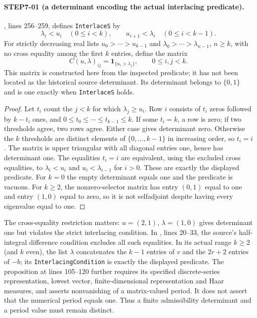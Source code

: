 \paragraph{STEP7-01 (a determinant encoding the actual interlacing predicate).}
, lines 256--259, defines \texttt{InterlaceS} by
\[
 \lambda_i<u_i\quad(0\le i<k),\qquad
 u_{i+1}<\lambda_i\quad(0\le i<k-1).
\]
For strictly decreasing real lists $u_0>\cdots>u_{k-1}$ and $\lambda_0>\cdots>\lambda_{n-1}$, $n\ge k$, with no cross equality among the first $k$ entries, define the matrix
\[
 C(u,\lambda)_{ij}=\mathbf1_{\{u_i>\lambda_j\}},\qquad 0\le i,j<k.
\]
This matrix is constructed here from the inspected predicate; it has not been located as the historical source determinant. Its determinant belongs to $\{0,1\}$ and is one exactly when \texttt{InterlaceS} holds.
\begin{proof}
Let $t_i$ count the $j<k$ for which $\lambda_j\ge u_i$. Row $i$ consists of $t_i$ zeros followed by $k-t_i$ ones, and $0\le t_0\le\cdots\le t_{k-1}\le k$. If some $t_i=k$, a row is zero; if two thresholds agree, two rows agree. Either case gives determinant zero. Otherwise the $k$ thresholds are distinct elements of $\{0,\ldots,k-1\}$ in increasing order, so $t_i=i$. The matrix is upper triangular with all diagonal entries one, hence has determinant one. The equalities $t_i=i$ are equivalent, using the excluded cross equalities, to $\lambda_i<u_i$ and $u_i<\lambda_{i-1}$ for $i>0$. These are exactly the displayed predicate. For $k=0$ the empty determinant equals one and the predicate is vacuous. For $k\ge2$, the nonzero-selector matrix has entry $(0,1)$ equal to one and entry $(1,0)$ equal to zero, so it is not selfadjoint despite having every eigenvalue equal to one.
\end{proof}
The cross-equality restriction matters: $u=(2,1)$, $\lambda=(1,0)$ gives determinant one but violates the strict interlacing condition. In , lines 20--33, the source's half-integral difference condition excludes all such equalities. In its actual range $k\ge2$ (and $k$ even), the list $\lambda$ concatenates the $k-1$ entries of $v$ and the $2r+2$ entries of $-b$; its \texttt{InterlacingCondition} is exactly the displayed predicate. The proposition at lines 105--120 further requires its specified discrete-series representation, lowest vector, finite-dimensional representation and Haar measures, and asserts nonvanishing of a matrix-valued period. It does not assert that the numerical period equals one. Thus a finite admissibility determinant and a period value must remain distinct.

